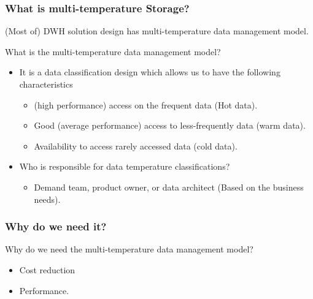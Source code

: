 \begin{frame}
\frametitle{What is multi-temperature Storage?}

\begin{wideitemize}
\item (Most of) DWH solution design has multi-temperature data management model.
\item What is the multi-temperature data management model?
\begin{itemize}[<+->]
	\item It is a data classification design which allows us to have the following characteristics
	\begin{itemize}[<+->]
		\item  (high performance) access on the frequent data (Hot data).
		\item Good (average performance) access to less-frequently data (warm data).
		\item Availability to access rarely accessed data (cold data).
	\end{itemize}
	\item Who is responsible for data temperature classifications?
	\begin{itemize}[<+->]
		\item Demand team, product owner, or data architect (Based on the business needs).
	\end{itemize}
\end{itemize}
\end{wideitemize}
\end{frame}


\begin{frame}
\frametitle{Why do we need it?}

\begin{wideitemize}
\item Why do we need the multi-temperature data management model?
\begin{itemize}[<+->]
\item Cost reduction \blue{\faDollar \faDollar \faDollar \faDollar}
\item Performance.
\end{itemize}
\end{wideitemize}
\end{frame}

